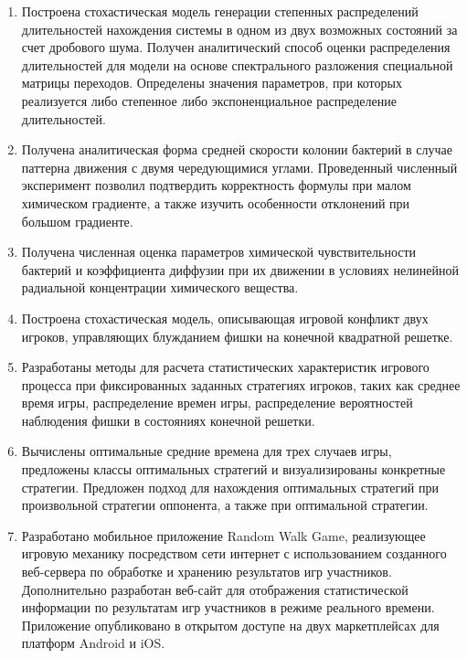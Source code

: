 \begin{enumerate}
  \item Построена стохастическая модель генерации степенных распределений длительностей нахождения системы в одном из двух возможных состояний за счет дробового шума. Получен аналитический способ оценки распределения длительностей для модели на основе спектрального разложения специальной матрицы переходов. Определены значения параметров, при которых реализуется либо степенное либо экспоненциальное распределение длительностей.
  \item Получена аналитическая форма средней скорости колонии бактерий в случае паттерна движения с двумя чередующимися углами. Проведенный численный эксперимент позволил подтвердить корректность формулы при малом химическом градиенте, а также изучить особенности отклонений при большом градиенте. 
  \item Получена численная оценка параметров химической чувствительности бактерий и коэффициента диффузии при их движении в условиях нелинейной радиальной концентрации химического вещества.
  \item Построена стохастическая модель, описывающая игровой конфликт двух игроков, управляющих блужданием фишки на конечной квадратной решетке. 
  \item Разработаны методы для расчета статистических характеристик игрового процесса при фиксированных заданных стратегиях игроков, таких как среднее время игры, распределение времен игры, распределение вероятностей наблюдения фишки в состояниях конечной решетки. 
  \item Вычислены оптимальные средние времена для трех случаев игры, предложены классы оптимальных стратегий и визуализированы конкретные стратегии. Предложен подход для нахождения оптимальных стратегий при произвольной стратегии оппонента, а также при оптимальной стратегии.
  \item Разработано мобильное приложение Random Walk Game, реализующее игровую механику посредством сети интернет с использованием созданного веб-сервера по обработке и хранению результатов игр участников. Дополнительно разработан веб-сайт для отображения статистической информации по результатам игр участников в режиме реального времени. Приложение опубликовано в открытом доступе на двух маркетплейсах для платформ Android и iOS.

\end{enumerate}
